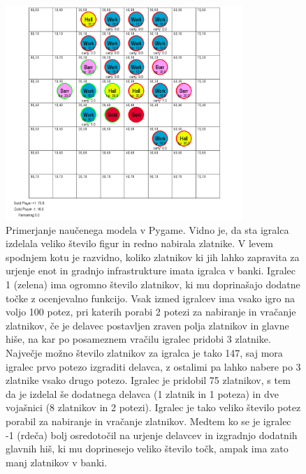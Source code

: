 \documentclass[a4paper, 12pt]{book}
\begin{document}
{\begin{figure}[h!]
	\begin{center}
		\includegraphics[width=0.8\textwidth]{photos/pit_100_game1.pdf}
	\end{center}
	\caption{Primerjanje naučenega modela v Pygame. 
		Vidno je, da sta igralca izdelala veliko število figur in redno nabirala zlatnike. 
		V levem spodnjem kotu je razvidno, koliko zlatnikov ki jih lahko zapravita za urjenje enot in gradnjo infrastrukture imata igralca v banki.
		Igralec 1 (zelena) ima ogromno število zlatnikov, ki mu doprinašajo dodatne točke z ocenjevalno funkcijo.
		Vsak izmed igralcev ima vsako igro na voljo 100 potez, pri katerih porabi 2 potezi za nabiranje in vračanje zlatnikov, če je delavec postavljen zraven polja zlatnikov in glavne hiše, na kar po posameznem vračilu igralec pridobi 3 zlatnike. Največje možno število zlatnikov za igralca je tako 147, saj mora igralec prvo potezo izgraditi delavca, z ostalimi pa lahko nabere po 3 zlatnike vsako drugo potezo.
		Igralec je pridobil 75 zlatnikov, s tem da je izdelal še dodatnega delavca (1 zlatnik in 1 poteza) in dve vojašnici (8 zlatnikov in 2 potezi).
		Igralec je tako veliko število potez porabil za nabiranje in vračanje zlatnikov.
		Medtem ko se je igralec -1 (rdeča) bolj osredotočil na urjenje delavcev in izgradnjo dodatnih glavnih hiš, ki mu doprinesejo veliko število točk, ampak ima zato manj zlatnikov v banki.}
	\label{pit_100_game1}
\end{figure}

}
\end{document}
